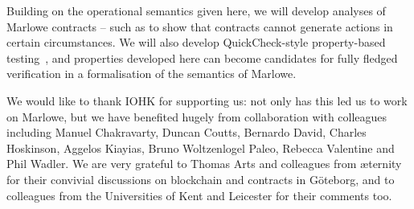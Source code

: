 \documentclass[runningheads]{llncs}
\begin{document}
Building on the operational semantics given here, we will develop analyses of Marlowe contracts -- such as to show that 
contracts cannot generate  actions in certain circumstances. We will also develop  
QuickCheck-style property-based testing~\cite{quickCheck}, and properties developed here can become candidates for fully 
fledged verification in a formalisation of the semantics of Marlowe.

We would like to thank IOHK for supporting us: not only has this led us to work on Marlowe, but we have benefited 
hugely from collaboration with colleagues including Manuel Chakravarty, Duncan Coutts, Bernardo David, Charles 
Hoskinson, Aggelos Kiayias, %
Bruno Woltzenlogel Paleo, Rebecca Valentine and Phil Wadler. We are  very 
grateful to Thomas Arts and colleagues from \ae{}ternity for their convivial discussions on blockchain and contracts in 
G\"oteborg, and to colleagues from the Universities of Kent and Leicester for their comments too.





\end{document}
